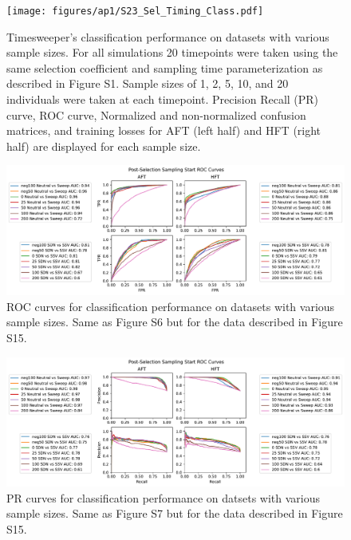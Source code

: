 \begin{figure}
    \centering
    \texttt{[image: figures/ap1/S23\_Sel\_Timing\_Class.pdf]}
    \caption[Timesweeper’s classification performance on datasets with various sample sizes.]{Timesweeper’s classification performance on datasets with various sample sizes. For all simulations 20 timepoints were taken using the same selection coefficient and sampling time parameterization as described in Figure S1. Sample sizes of 1, 2, 5, 10, and 20 individuals were taken at each timepoint. Precision Recall (PR) curve, ROC curve, Normalized and non-normalized confusion matrices, and training losses for AFT (left half) and HFT (right half) are displayed for each sample size.}
    \label{fig:S23_Sel_Timing_Class}
\end{figure}

\begin{figure}
    \centering
    \includegraphics[width=\textwidth]{figures/ap1/S24_Sel_Timing_ROC.pdf}
    \caption[ROC curves for classification performance on datasets with various sample sizes.]{ROC curves for classification performance on datasets with various sample sizes. Same as Figure S6 but for the data described in Figure S15.}
    \label{fig:S24_Sel_Timing_ROC}
\end{figure}

\begin{figure}
    \centering
    \includegraphics[width=\textwidth]{figures/ap1/S25_Sel_Timing_PR.pdf}
    \caption[PR curves for classification performance on datsets with various sample sizes.]{PR curves for classification performance on datsets with various sample sizes. Same as Figure S7 but for the data described in Figure S15.}
    \label{fig:S25_Sel_Timing_PR}
\end{figure}

